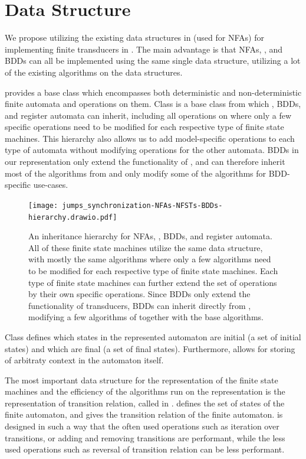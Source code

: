 \section{Data Structure}
\label{sec:mata_data_structure}
We propose utilizing the existing data structures in \mata (used for NFAs) for implementing finite transducers in \mata.
The main advantage is that NFAs, \nfts, and BDDs can all be implemented using the same single data structure, utilizing a lot of the existing algorithms on the data structures.

\mata provides a base class \nfaClass which encompasses both deterministic and non-deterministic finite automata and operations on them.
Class \nfaClass is a base class from which \nfts, BDDs, and register automata can inherit, including all operations on \nfaClass where only a few specific operations need to be modified for each respective type of finite state machines.
This hierarchy also allows us to add model-specific operations to each type of automata without modifying operations for the other automata.
BDDs in our representation only extend the functionality of \nfts, and can therefore inherit most of the algorithms from \nfts and only modify some of the algorithms for BDD-specific use-cases.

\begin{figure}[ht]
  \centering
  \texttt{[image: jumps\_synchronization-NFAs-NFSTs-BDDs-hierarchy.drawio.pdf]}
  \caption{
    An inheritance hierarchy for NFAs, \nfts, BDDs, and register automata.
    All of these finite state machines utilize the same data structure, with mostly the same algorithms where only a few algorithms need to be modified for each respective type of finite state machines.
    Each type of finite state machines can further extend the set of operations by their own specific operations.
    Since BDDs only extend the functionality of transducers, BDDs can inherit directly from \nfts, modifying a few algorithms of \nfts together with the base \nfaClass algorithms.
  }
\end{figure}

Class \nfaClass defines which states in the represented automaton are initial (a set of initial states) and which are final (a set of final states).
Furthermore, \nfaClass allows for storing of arbitraty context in the automaton itself.

The most important data structure for the representation of the finite state machines and the efficiency of the algorithms run on the representation is the representation of transition relation, called \deltastruct in \mata.
\deltastruct defines the set of states of the finite automaton, and gives the transition relation of the finite automaton.
\deltastruct is designed in such a way that the often used operations such as iteration over transitions, or adding and removing transitions are performant, while the less used operations such as reversal of transition relation can be less performant.

